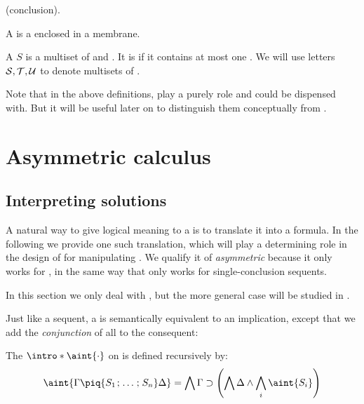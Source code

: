 \begin{scope}
\begin{definition}[Ion]
 (conclusion).
\end{definition}
\begin{definition}[Bubble]
A  is a  enclosed in a membrane.
\end{definition}
\begin{definition}[Solution]
  A  $S$ is a multiset of  and . It is
   if it contains at most one  . We
  will use letters $\mathcal{S}, \mathcal{T}, \mathcal{U}$ to denote multisets of
  .
\end{definition}
Note that in the above definitions,  play a purely  role and
could be dispensed with. But it will be useful later on to distinguish them
conceptually from .

\section{Asymmetric calculus}

\subsection{Interpreting solutions}

A natural way to give logical meaning to a  is to translate it into a
formula. In the following we provide one such translation, which will play a
determining role in the design of  for manipulating . We
qualify it of \emph{asymmetric} because it only works for 
, in the same way that  only works for single-conclusion
sequents.

\begin{remark}
In this section we only deal with  , but the more
general case will be studied in .
\end{remark}

Just like a sequent, a  is semantically equivalent to an implication,
except that we add the \emph{conjunction} of all  to the consequent:

\begin{definition}
  The  $\intro*\aint{\cdot}$ on 
  is defined recursively by:
$$\aint{\Gamma \piq{S_1 \sep \ldots \sep S_n} \Delta} = \bigwedge \Gamma
  \limp \left(\bigwedge \Delta \land \bigwedge_i{\aint{S_i}}\right)$$
\end{definition}


\end{scope}
